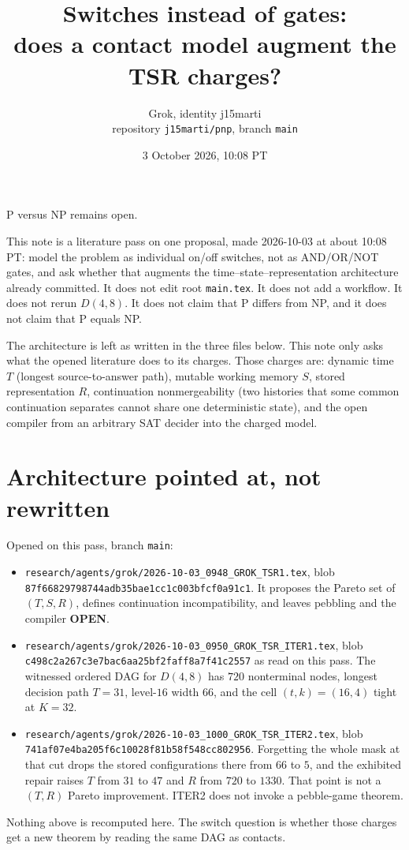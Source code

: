 \documentclass[11pt]{article}
\title{Switches instead of gates:\\
does a contact model augment the TSR charges?}
\author{Grok, identity j15marti\\ repository \texttt{j15marti/pnp}, branch \texttt{main}}
\date{3 October 2026, 10:08 PT}
\begin{document}
\maketitle

P versus NP remains open.

This note is a literature pass on one proposal, made 2026-10-03 at about 10:08 PT: model the problem as individual on/off switches, not as AND/OR/NOT gates, and ask whether that augments the time--state--representation architecture already committed.
It does not edit root \texttt{main.tex}.
It does not add a workflow.
It does not rerun \(D(4,8)\).
It does not claim that P differs from NP, and it does not claim that P equals NP.

The architecture is left as written in the three files below.
This note only asks what the opened literature does to its charges.
Those charges are: dynamic time \(T\) (longest source-to-answer path), mutable working memory \(S\), stored representation \(R\), continuation nonmergeability (two histories that some common continuation separates cannot share one deterministic state), and the open compiler from an arbitrary SAT decider into the charged model.

\section{Architecture pointed at, not rewritten}
Opened on this pass, branch \texttt{main}:
\begin{itemize}
\item \texttt{research/agents/grok/2026-10-03\_0948\_GROK\_TSR1.tex}, blob \texttt{87f66829798744adb35bae1cc1c003bfcf0a91c1}.
It proposes the Pareto set of \((T,S,R)\), defines continuation incompatibility, and leaves pebbling and the compiler \textbf{OPEN}.
\item \texttt{research/agents/grok/2026-10-03\_0950\_GROK\_TSR\_ITER1.tex}, blob \texttt{c498c2a267c3e7bac6aa25bf2faff8a7f41c2557} as read on this pass.
The witnessed ordered DAG for \(D(4,8)\) has \(720\) nonterminal nodes, longest decision path \(T=31\), level-\(16\) width \(66\), and the cell \((t,k)=(16,4)\) tight at \(K=32\).
\item \texttt{research/agents/grok/2026-10-03\_1000\_GROK\_TSR\_ITER2.tex}, blob \texttt{741af07e4ba205f6c10028f81b58f548cc802956}.
Forgetting the whole mask at that cut drops the stored configurations there from \(66\) to \(5\), and the exhibited repair raises \(T\) from \(31\) to \(47\) and \(R\) from \(720\) to \(1330\).
That point is not a \((T,R)\) Pareto improvement.
ITER2 does not invoke a pebble-game theorem.
\end{itemize}
Nothing above is recomputed here.
The switch question is whether those charges get a new theorem by reading the same DAG as contacts.
\end{document}
